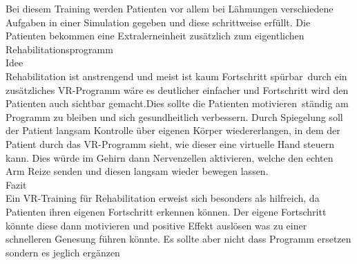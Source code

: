 
Bei diesem Training werden Patienten vor allem bei Lähmungen verschiedene Aufgaben in einer Simulation gegeben und diese schrittweise erfüllt. Die Patienten bekommen eine Extralerneinheit zusätzlich zum eigentlichen Rehabilitationsprogramm\\

Idee\\
Rehabilitation ist anstrengend und meist ist kaum Fortschritt spürbar durch ein zusätzliches VR-Programm wäre es deutlicher einfacher und Fortschritt wird den Patienten auch sichtbar gemacht.Dies sollte die Patienten motivieren ständig am Programm zu bleiben und sich gesundheitlich verbessern. Durch Spiegelung soll der Patient langsam Kontrolle über eigenen Körper wiedererlangen, in dem der Patient durch das VR-Programm sieht, wie dieser eine virtuelle Hand steuern kann. Dies würde im Gehirn dann Nervenzellen aktivieren, welche den echten Arm Reize senden und diesen langsam wieder bewegen lassen.\\

Fazit\\
Ein VR-Training für Rehabilitation erweist sich besonders als hilfreich, da Patienten ihren eigenen Fortschritt erkennen können. Der eigene Fortschritt könnte diese dann motivieren und positive Effekt auslösen was zu einer schnelleren Genesung führen könnte. Es sollte aber nicht dass Programm ersetzen sondern es jeglich ergänzen


